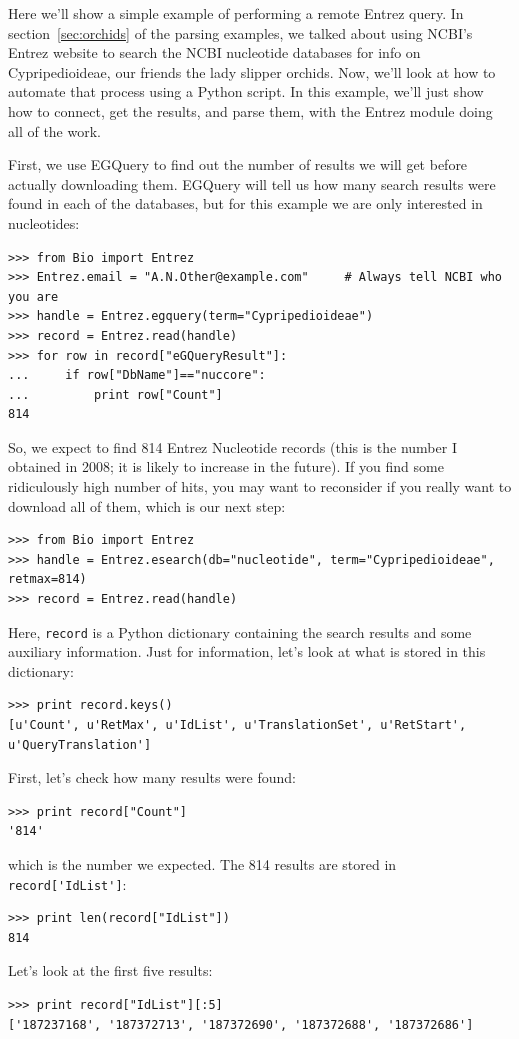 \documentclass{report}
\begin{document}
Here we'll show a simple example of performing a remote Entrez query. In section~\ref{sec:orchids} of the parsing examples, we talked about using NCBI's Entrez website to search the NCBI nucleotide databases for info on Cypripedioideae, our friends the lady slipper orchids. Now, we'll look at how to automate that process using a Python script. In this example, we'll just show how to connect, get the results, and parse them, with the Entrez module doing all of the work.

First, we use EGQuery to find out the number of results we will get before actually downloading them.  EGQuery will tell us how many search results were found in each of the databases, but for this example we are only interested in nucleotides:
\begin{verbatim}
>>> from Bio import Entrez
>>> Entrez.email = "A.N.Other@example.com"     # Always tell NCBI who you are
>>> handle = Entrez.egquery(term="Cypripedioideae")
>>> record = Entrez.read(handle)
>>> for row in record["eGQueryResult"]:
...     if row["DbName"]=="nuccore":
...         print row["Count"]
814
\end{verbatim}

So, we expect to find 814 Entrez Nucleotide records (this is the number I obtained in 2008; it is likely to increase in the future). If you find some ridiculously high number of hits, you may want to reconsider if you really want to download all of them, which is our next step:
\begin{verbatim}
>>> from Bio import Entrez
>>> handle = Entrez.esearch(db="nucleotide", term="Cypripedioideae", retmax=814)
>>> record = Entrez.read(handle)
\end{verbatim}

Here, \verb+record+ is a Python dictionary containing the search results and some auxiliary information. Just for information, let's look at what is stored in this dictionary:
\begin{verbatim}
>>> print record.keys()
[u'Count', u'RetMax', u'IdList', u'TranslationSet', u'RetStart', u'QueryTranslation']
\end{verbatim}
First, let's check how many results were found:
\begin{verbatim}
>>> print record["Count"]
'814'
\end{verbatim}
which is the number we expected. The 814 results are stored in \verb+record['IdList']+:
\begin{verbatim}
>>> print len(record["IdList"])
814
\end{verbatim}
Let's look at the first five results:
\begin{verbatim}
>>> print record["IdList"][:5]
['187237168', '187372713', '187372690', '187372688', '187372686']
\end{verbatim}
\end{document}
